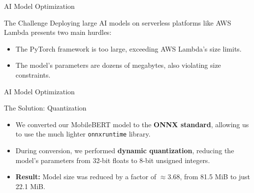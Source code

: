 \documentclass{beamer}
\begin{document}
\begin{frame}{AI Model Optimization}
    \begin{alertblock}{The Challenge}
        Deploying large AI models on serverless platforms like AWS Lambda presents two main hurdles:
        \begin{itemize}
            \item The PyTorch framework is too large, exceeding AWS Lambda's size limits.
            \item The model's parameters are dozens of megabytes, also violating size constraints.
        \end{itemize}
    \end{alertblock}
\end{frame}

\begin{frame}{AI Model Optimization}
    \begin{exampleblock}{The Solution: Quantization}
        \begin{itemize}
            \item We converted our MobileBERT model to the \textbf{ONNX standard}, allowing us to use the much lighter \texttt{onnxruntime} library.
            \item During conversion, we performed \textbf{dynamic quantization}, reducing the model's parameters from 32-bit floats to 8-bit unsigned integers.
            \item \textbf{Result:} Model size was reduced by a factor of $\approx3.68$, from 81.5 MiB to just 22.1 MiB.
        \end{itemize}
    \end{exampleblock}
\end{frame}
\end{document}
